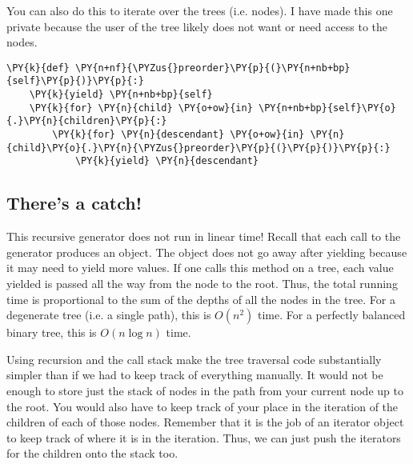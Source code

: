 You can also do this to iterate over the trees (i.e. nodes).  I have made this one private because the user of the tree likely does not want or need access to the nodes.

\begin{Verbatim}[commandchars=\\\{\}]
\PY{k}{def} \PY{n+nf}{\PYZus{}preorder}\PY{p}{(}\PY{n+nb+bp}{self}\PY{p}{)}\PY{p}{:}
    \PY{k}{yield} \PY{n+nb+bp}{self}
    \PY{k}{for} \PY{n}{child} \PY{o+ow}{in} \PY{n+nb+bp}{self}\PY{o}{.}\PY{n}{children}\PY{p}{:}
        \PY{k}{for} \PY{n}{descendant} \PY{o+ow}{in} \PY{n}{child}\PY{o}{.}\PY{n}{\PYZus{}preorder}\PY{p}{(}\PY{p}{)}\PY{p}{:}
            \PY{k}{yield} \PY{n}{descendant}
\end{Verbatim}


\subsection{There's a catch!}


This recursive generator does not run in linear time!
Recall that each call to the generator produces an object.
The object does not go away after yielding because it may need to yield more values.
If one calls this method on a tree, each value yielded is passed all the way from the node to the root.
Thus, the total running time is proportional to the sum of the depths of all the nodes in the tree.
For a degenerate tree (i.e. a single path), this is $O(n^2)$ time.
For a perfectly balanced binary tree, this is $O(n \log n)$ time.


Using recursion and the call stack make the tree traversal code substantially simpler than if we had to keep track of everything manually.
It would not be enough to store just the stack of nodes in the path from your current node up to the root. You would also have to keep track of your place in the iteration of the children of each of those nodes.  Remember that it is the job of an iterator object to keep track of where it is in the iteration. Thus, we can just push the iterators for the children onto the stack too.

